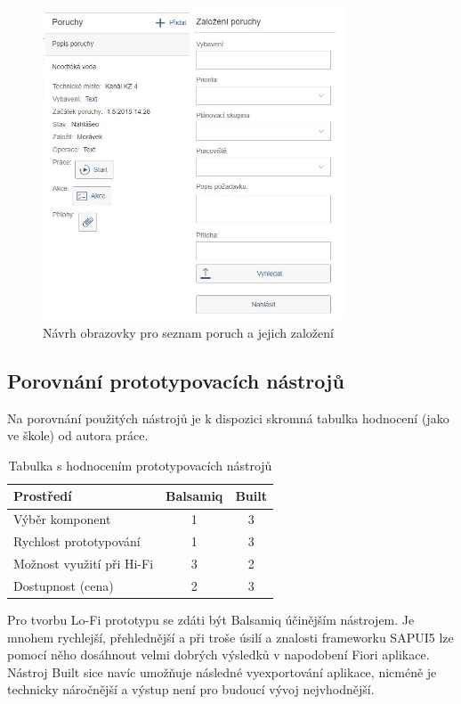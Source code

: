 \documentclass[thesis=M,czech]{FITthesis}[2012/06/26]
\begin{document}
\begin{figure}[H]
	\centering
	\includegraphics[width=0.8\textwidth]{images/bu_mob}
	\caption{Návrh obrazovky pro seznam poruch a jejich založení}
	\label{img:bu_mob}
\end{figure}

\subsection{Porovnání prototypovacích nástrojů}
Na porovnání použitých nástrojů je k dispozici skromná tabulka hodnocení (jako ve škole) od autora práce.
\begin{center}
	\begin{table}[H]
		\centering
		\begin{tabular}{| l | c | c |}
			\hline 
			Prostředí 						& Balsamiq 	&	Built		\\ 
			\hline	
			\hline
			Výběr komponent					&	1		&	3			\\ 
			\hline
			Rychlost prototypování			&	1		&	3			\\
			\hline
			Možnost využití při Hi-Fi		&	3		&	2			\\
			\hline
			Dostupnost (cena)				&	2		&	3			\\
			\hline		
		\end{tabular}
		\caption {Tabulka s hodnocením prototypovacích nástrojů} 
		\label{tab:prototyp_comp}
	\end{table}
\end{center}
Pro tvorbu Lo-Fi prototypu se zdáti být Balsamiq účinějším nástrojem. Je mnohem rychlejší, přehlednější a při troše úsilí a znalosti frameworku SAPUI5 lze pomocí něho dosáhnout velmi dobrých výsledků v napodobení Fiori aplikace. Nástroj Built sice navíc umožňuje následné vyexportování aplikace, nicméně je technicky náročnější a výstup není pro budoucí vývoj nejvhodnější.
\end{document}
